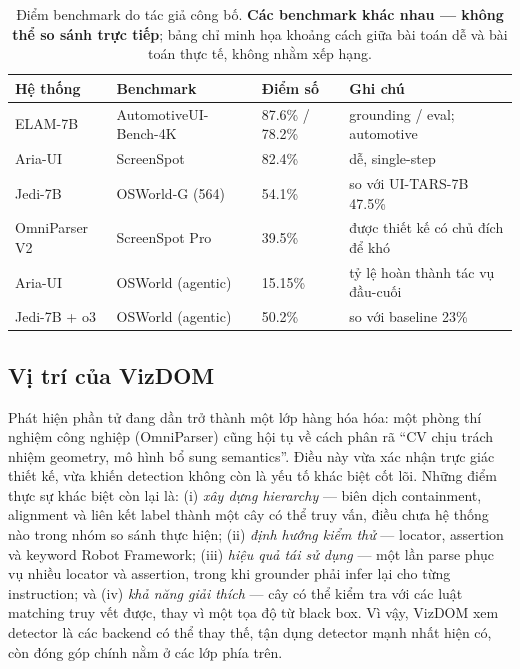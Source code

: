 \documentclass[11pt,a4paper]{article}
\begin{document}
\begin{table}[H]
  \centering\footnotesize
  \caption{Điểm benchmark do tác giả công bố. \textbf{Các benchmark khác nhau ---
  không thể so sánh trực tiếp}; bảng chỉ minh họa khoảng cách giữa bài toán dễ và
  bài toán thực tế, không nhằm xếp hạng.}
  \label{tab:bench}
  \begin{tabular}{@{}p{3.0cm}p{4.4cm}p{3.0cm}p{3.2cm}@{}}
    \toprule
    Hệ thống & Benchmark & Điểm số & Ghi chú \\
    \midrule
    ELAM-7B & AutomotiveUI-Bench-4K & 87.6\% / 78.2\% & grounding / eval; automotive \\
    Aria-UI & ScreenSpot & 82.4\% & dễ, single-step \\
    Jedi-7B & OSWorld-G (564) & 54.1\% & so với UI-TARS-7B 47.5\% \\
    OmniParser V2 & ScreenSpot Pro & 39.5\% & được thiết kế có chủ đích để khó \\
    Aria-UI & OSWorld (agentic) & 15.15\% & tỷ lệ hoàn thành tác vụ đầu-cuối \\
    Jedi-7B + o3 & OSWorld (agentic) & 50.2\% & so với baseline 23\% \\
    \bottomrule
  \end{tabular}
\end{table}

\subsection{Vị trí của VizDOM}
Phát hiện phần tử đang dần trở thành một lớp hàng hóa hóa: một phòng thí nghiệm
công nghiệp (OmniParser) cũng hội tụ về cách phân rã ``CV chịu trách nhiệm geometry,
mô hình bổ sung semantics''. Điều này vừa xác nhận trực giác thiết kế, vừa khiến
detection không còn là yếu tố khác biệt cốt lõi. Những điểm thực sự khác biệt còn
lại là: (i) \emph{xây dựng hierarchy} --- biên dịch containment, alignment và liên
kết label thành một cây có thể truy vấn, điều chưa hệ thống nào trong nhóm so sánh
thực hiện; (ii) \emph{định hướng kiểm thử} --- locator, assertion và keyword Robot
Framework; (iii) \emph{hiệu quả tái sử dụng} --- một lần parse phục vụ nhiều locator
và assertion, trong khi grounder phải infer lại cho từng instruction; và (iv)
\emph{khả năng giải thích} --- cây có thể kiểm tra với các luật matching truy vết
được, thay vì một tọa độ từ black box. Vì vậy, VizDOM xem detector là các backend
có thể thay thế, tận dụng detector mạnh nhất hiện có, còn đóng góp chính nằm ở các
lớp phía trên.
\end{document}
